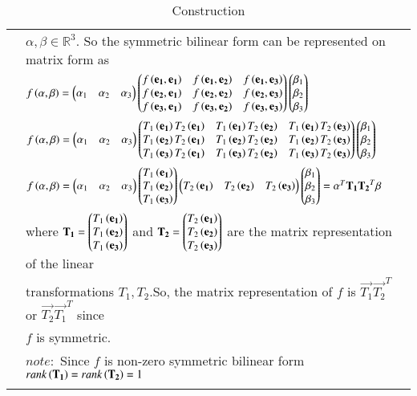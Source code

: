 \begin{longtable}{|l|l|}
    &$\alpha,\beta\in\mathbb{R}^3$. So the symmetric bilinear form can be represented on matrix form as\\
    &$f\left(\alpha,\beta\right)=\begin{pmatrix}\alpha_1&\alpha_2&\alpha_3\end{pmatrix}\begin{pmatrix}f\left(\mathbf{e_1},\mathbf{e_1}\right)&f\left(\mathbf{e_1},\mathbf{e_2}\right)&f\left(\mathbf{e_1},\mathbf{e_3}\right)\\f\left(\mathbf{e_2},\mathbf{e_1}\right)&f\left(\mathbf{e_2},\mathbf{e_2}\right)&f\left(\mathbf{e_2},\mathbf{e_3}\right)\\f\left(\mathbf{e_3},\mathbf{e_1}\right)&f\left(\mathbf{e_3},\mathbf{e_2}\right)&f\left(\mathbf{e_3},\mathbf{e_3}\right)\end{pmatrix}\begin{pmatrix}\beta_1\\\beta_2\\\beta_3\end{pmatrix}$\\
    &$f\left(\alpha,\beta\right)=\begin{pmatrix}\alpha_1&\alpha_2&\alpha_3\end{pmatrix}\begin{pmatrix}T_1\left(\mathbf{e_1}\right)T_2\left(\mathbf{e_1}\right)&T_1\left(\mathbf{e_1}\right)T_2\left(\mathbf{e_2}\right)&T_1\left(\mathbf{e_1}\right)T_2\left(\mathbf{e_3}\right)\\T_1\left(\mathbf{e_2}\right)T_2\left(\mathbf{e_1}\right)&T_1\left(\mathbf{e_2}\right)T_2\left(\mathbf{e_2}\right)&T_1\left(\mathbf{e_2}\right)T_2\left(\mathbf{e_3}\right)\\T_1\left(\mathbf{e_3}\right)T_2\left(\mathbf{e_1}\right)&T_1\left(\mathbf{e_3}\right)T_2\left(\mathbf{e_2}\right)&T_1\left(\mathbf{e_3}\right)T_2\left(\mathbf{e_3}\right)\\\end{pmatrix}\begin{pmatrix}\beta_1\\\beta_2\\\beta_3\end{pmatrix}$\\
    &$f\left(\alpha,\beta\right)=\begin{pmatrix}\alpha_1&\alpha_2&\alpha_3\end{pmatrix}\begin{pmatrix}T_1\left(\mathbf{e_1}\right)\\T_1\left(\mathbf{e_2}\right)\\T_1\left(\mathbf{e_3}\right)\end{pmatrix}\begin{pmatrix}T_2\left(\mathbf{e_1}\right)&T_2\left(\mathbf{e_2}\right)&T_2\left(\mathbf{e_3}\right)\end{pmatrix}\begin{pmatrix}\beta_1\\\beta_2\\\beta_3\end{pmatrix}=\alpha^T\mathbf{T_1}\mathbf{T_2}^T\beta$\\
    &where $\mathbf{T_1}=\begin{pmatrix}T_1\left(\mathbf{e_1}\right)\\T_1\left(\mathbf{e_2}\right)\\T_1\left(\mathbf{e_3}\right)\end{pmatrix}$ and $\mathbf{T_2}=\begin{pmatrix}T_2\left(\mathbf{e_1}\right)\\T_2\left(\mathbf{e_2}\right)\\T_2\left(\mathbf{e_3}\right)\end{pmatrix}$ are the matrix representation of the linear\\
    &transformations $T_1,T_2$.So, the matrix representation of $f$ is $\vec{T_1}\vec{T_2}^T$ or $\vec{T_2}\vec{T_1}^T$ since\\
    &$f$ is symmetric.\\
    &$note:$ Since $f$ is non-zero symmetric bilinear form $rank\left(\mathbf{T_1}\right)=rank\left(\mathbf{T_2}\right)=1$\\
    \hline
    \caption{Construction}
    \label{eq:solutions/2014/dec/73/tab:Cons}
\end{longtable}
